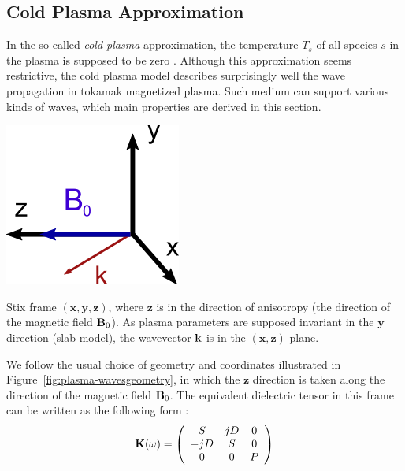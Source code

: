 \subsection{Cold Plasma Approximation}
In the so-called \textit{cold plasma} approximation, the temperature $T_s$ of all species $s$ in the plasma is supposed to be zero \cite[chap.5]{Brambilla1998}. Although this approximation seems restrictive, the cold plasma model describes surprisingly well the wave propagation in tokamak magnetized plasma. Such medium can support various kinds of waves, which main properties are derived in this section. 
\begin{marginfigure}
	\centering
	\includegraphics[width=0.8\linewidth]{figures/chap2/plasma-waves_geometry}
	\caption{Stix frame $(\mathbf{x},\mathbf{y},\mathbf{z})$, where $\mathbf{z}$ is in the direction of anisotropy (the direction of the magnetic field ${\mathbf B}_0$). As plasma parameters are supposed invariant in the $\mathbf{y}$ direction (slab model), the wavevector ${\mathbf k}$ is in the $(\mathbf{x},\mathbf{z})$ plane. }
	\label{fig:plasma-wavesgeometry}
\end{marginfigure}
We follow the usual choice of geometry and coordinates illustrated in Figure~\ref{fig:plasma-wavesgeometry}, in which the $\mathbf{z}$ direction is taken along the direction of the magnetic field ${\mathbf B}_0$.  The equivalent dielectric tensor in this frame can be written as the following form :
\begin{equation}
{\mathbf K}(\omega)
=
\left(\begin{array}{ccc}
	S & j D & 0\\
	-j D & S & 0\\
	0 & 0 & P
\end{array}\right)
\label{eq:stix_K}
\end{equation}
